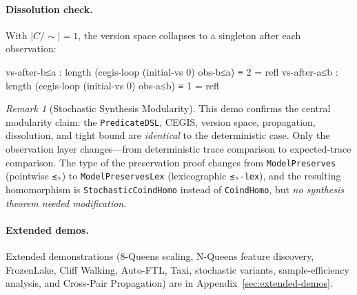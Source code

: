 \documentclass[9pt,a4paper]{article}
\theoremstyle{plain}
\theoremstyle{definition}
\theoremstyle{remark}
\newtheorem{remark}{Remark}
\begin{document}
\paragraph{Dissolution check.}  With $|C/{\sim}| = 1$, the version space collapses to a singleton after each observation:

\begin{spec}
vs-after-b≤a : length (cegis-loop (initial-vs 0) obs-b≤a) ≡ 2   = refl
vs-after-a≤b : length (cegis-loop (initial-vs 0) obs-a≤b) ≡ 1   = refl
\end{spec}

\begin{remark}[Stochastic Synthesis Modularity]
This demo confirms the central modularity claim: the \texttt{PredicateDSL}, CEGIS, version space, propagation, dissolution, and tight bound are \emph{identical} to the deterministic case.
Only the observation layer changes---from deterministic trace comparison to expected-trace comparison.
The type of the preservation proof changes from \texttt{ModelPreserves} (pointwise \texttt{≤ₛ}) to \texttt{ModelPreservesLex} (lexicographic \texttt{≤ₛ-lex}), and the resulting homomorphism is \texttt{StochasticCoindHomo} instead of \texttt{CoindHomo}, but \emph{no synthesis theorem needed modification}.
\end{remark}

\paragraph{Extended demos.}
Extended demonstrations (8-Queens scaling, N-Queens feature discovery, FrozenLake, Cliff Walking, Auto-FTL, Taxi, stochastic variants, sample-efficiency analysis, and Cross-Pair Propagation) are in Appendix~\ref{sec:extended-demos}.


\end{document}
